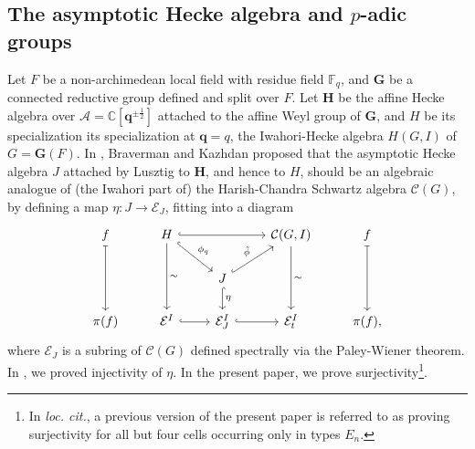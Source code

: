 \documentclass[10pt]{article}
\newcommand{\HH}{\mathbf{H}}
\newcommand{\C}{\mathbb{C}}
\newcommand{\F}{\mathbb{F}}
\newcommand{\G}{\mathbf{G}}
\newcommand{\bq}{\mathbf{q}}
\theoremstyle{definition}
\theoremstyle{remark}
\begin{document}
\subsection{The asymptotic Hecke algebra and $p$-adic groups}
Let $F$ be a non-archimedean local field with residue field $\F_q$, and $\G$ be a connected reductive group 
defined and split over $F$. Let $\HH$ be the affine Hecke algebra over $\mathcal{A}=\C[\bq^{\pm \frac{1}{2}}]$ 
attached to the affine Weyl group of $\G$, and $H$ be its specialization its specialization at $\bq=q$, the 
Iwahori-Hecke algebra $H(G,I)$ of $G=\G(F)$. In \cite{BK}, Braverman and Kazhdan proposed that the asymptotic
Hecke algebra $J$ attached by Lusztig to $\HH$, and hence to $H$, should be an algebraic analogue 
of (the Iwahori part of) the Harish-Chandra Schwartz algebra $\mathcal{C}(G)$, by defining a map 
$\eta\colon J\to \mathcal{E}_{J}$, fitting into a diagram
%
\begin{equation}
\label{eqn BK summary diagram}
\begin{tikzcd}
f\arrow[dd, mapsto]&H\arrow[dd, "\sim"]\arrow[dr, hook, "\phi_q"]\arrow[rr, hook]&&\mathcal{C}(G,I)\arrow[dd, "\sim"]&f\arrow[dd, mapsto]\\
&&J\arrow[ur, "\tilde{\phi}", hook]\arrow[d, "\eta", hook]&&\\
\pi(f)&\mathcal{E}^I\arrow[r, hook]&\mathcal{E}^I_J\arrow[r, hook]&\mathcal{E}_t^I&\pi(f),
\end{tikzcd}
\end{equation}
%
where $\mathcal{E}_J$ is a subring of $\mathcal{C}(G)$ defined
spectrally via the Paley-Wiener theorem. In \cite{Plancherel}, we proved injectivity of $\eta$.
In the present paper, we prove surjectivity\footnote{In \textit{loc. cit.}, a previous version of the present paper is referred to as proving surjectivity for all but four cells occurring only in types $E_n$.}.
\end{document}

